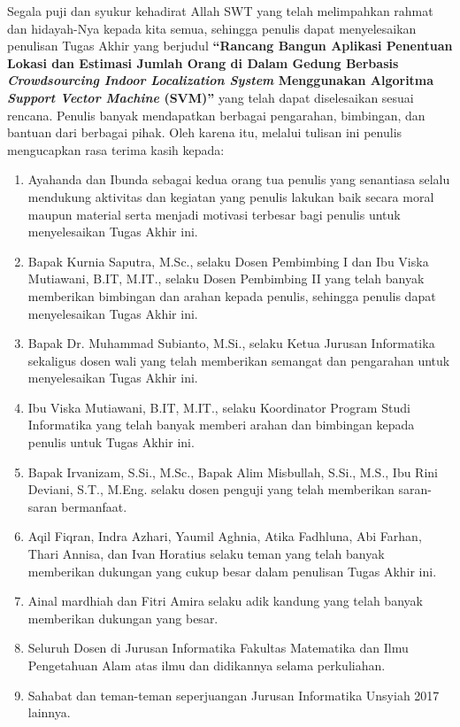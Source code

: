 \preface %


Segala puji dan syukur kehadirat Allah SWT yang telah melimpahkan rahmat dan hidayah-Nya kepada kita semua, sehingga penulis dapat menyelesaikan penulisan Tugas Akhir yang berjudul \textbf{“Rancang Bangun Aplikasi Penentuan Lokasi dan Estimasi Jumlah Orang di Dalam Gedung Berbasis \textit{Crowdsourcing Indoor Localization System} Menggunakan Algoritma \textit{Support Vector Machine} (SVM)”} yang telah dapat diselesaikan sesuai rencana. Penulis banyak mendapatkan berbagai pengarahan, bimbingan, dan bantuan dari berbagai pihak. Oleh karena itu, melalui tulisan ini penulis mengucapkan rasa terima kasih kepada:

\begin{enumerate}
	\item{Ayahanda dan Ibunda sebagai kedua orang tua penulis yang senantiasa selalu mendukung aktivitas dan kegiatan yang penulis lakukan baik secara moral maupun material serta menjadi motivasi terbesar bagi penulis untuk menyelesaikan Tugas Akhir ini.}
	\item{Bapak Kurnia Saputra, M.Sc., selaku Dosen Pembimbing I dan Ibu Viska Mutiawani, B.IT, M.IT., selaku Dosen Pembimbing II yang telah banyak memberikan bimbingan dan arahan kepada penulis, sehingga penulis dapat menyelesaikan Tugas Akhir ini.}
	\item {Bapak Dr. Muhammad Subianto, M.Si., selaku Ketua Jurusan Informatika sekaligus dosen wali yang telah memberikan semangat dan pengarahan untuk menyelesaikan Tugas Akhir ini.}
	\item {Ibu Viska Mutiawani, B.IT, M.IT., selaku Koordinator Program Studi Informatika yang telah banyak memberi arahan dan bimbingan kepada penulis untuk Tugas Akhir ini.}
	\item {Bapak Irvanizam, S.Si., M.Sc., Bapak Alim Misbullah, S.Si., M.S., Ibu Rini Deviani, S.T., M.Eng. selaku dosen penguji yang telah memberikan saran-saran bermanfaat.}
	\item {Aqil Fiqran, Indra Azhari, Yaumil Aghnia, Atika Fadhluna, Abi Farhan, Thari Annisa, dan Ivan Horatius selaku teman yang telah banyak memberikan dukungan yang cukup besar dalam penulisan Tugas Akhir ini.}

	\item {Ainal mardhiah dan Fitri Amira selaku adik kandung yang telah banyak memberikan dukungan yang besar.}
	      \item{Seluruh Dosen di Jurusan Informatika Fakultas Matematika dan Ilmu Pengetahuan Alam atas ilmu dan didikannya selama perkuliahan.}

	      \item{Sahabat dan teman-teman seperjuangan Jurusan Informatika Unsyiah 2017 lainnya.}
\end{enumerate}

